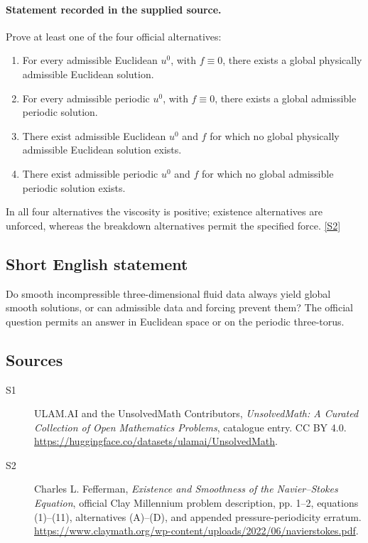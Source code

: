 \documentclass[11pt]{article}
\newcommand{\sref}[2]{\hyperlink{source:#1:#2}{[S#2]}}
\begin{document}
\paragraph{Statement recorded in the supplied source.}
Prove at least one of the four official alternatives:
\begin{enumerate}
 \item[(A)] For every admissible Euclidean \(u^0\), with \(f\equiv0\),
 there exists a global physically admissible Euclidean solution.
 \item[(B)] For every admissible periodic \(u^0\), with \(f\equiv0\),
 there exists a global admissible periodic solution.
 \item[(C)] There exist admissible Euclidean \(u^0\) and \(f\)
 for which no global physically admissible Euclidean solution exists.
 \item[(D)] There exist admissible periodic \(u^0\) and \(f\)
 for which no global admissible periodic solution exists.
\end{enumerate}
In all four alternatives the viscosity is positive; existence alternatives
are unforced, whereas the breakdown alternatives permit the specified force. \sref{statement}{2}
\subsection{Short English statement}
Do smooth incompressible three-dimensional fluid data always yield global smooth solutions, or can admissible data and forcing prevent them? The official question permits an answer in Euclidean space or on the periodic three-torus.
\subsection{Sources}
\begin{description}
\item[\hypertarget{source:statement:1}{S1}] ULAM.AI and the UnsolvedMath Contributors, \emph{UnsolvedMath: A Curated Collection of Open Mathematics Problems}, catalogue entry. CC BY 4.0. \url{https://huggingface.co/datasets/ulamai/UnsolvedMath}.
\item[\hypertarget{source:statement:2}{S2}] Charles L. Fefferman, \emph{Existence and Smoothness of the Navier--Stokes Equation}, official Clay Millennium problem description, pp. 1--2, equations (1)--(11), alternatives (A)--(D), and appended pressure-periodicity erratum. \url{https://www.claymath.org/wp-content/uploads/2022/06/navierstokes.pdf}.
\end{description}
\label{end:statement}
\end{document}
